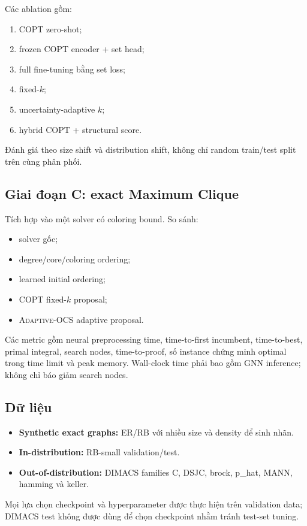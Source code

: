 \documentclass[11pt,a4paper]{article}
\newcommand{\method}{\textsc{Adaptive-OCS}}
\begin{document}
Các ablation gồm:
\begin{enumerate}[nosep]
    \item COPT zero-shot;
    \item frozen COPT encoder + set head;
    \item full fine-tuning bằng set loss;
    \item fixed-$k$;
    \item uncertainty-adaptive $k$;
    \item hybrid COPT + structural score.
\end{enumerate}
Đánh giá theo size shift và distribution shift, không chỉ random train/test split trên cùng phân phối.

\subsection{Giai đoạn C: exact Maximum Clique}

Tích hợp vào một solver có coloring bound. So sánh:
\begin{itemize}[nosep]
    \item solver gốc;
    \item degree/core/coloring ordering;
    \item learned initial ordering;
    \item COPT fixed-$k$ proposal;
    \item \method{} adaptive proposal.
\end{itemize}

Các metric gồm neural preprocessing time, time-to-first incumbent, time-to-best, primal integral, search nodes, time-to-proof, số instance chứng minh optimal trong time limit và peak memory. Wall-clock time phải bao gồm GNN inference; không chỉ báo giảm search nodes.

\subsection{Dữ liệu}

\begin{itemize}[nosep]
    \item \textbf{Synthetic exact graphs:} ER/RB với nhiều size và density để sinh nhãn.
    \item \textbf{In-distribution:} RB-small validation/test.
    \item \textbf{Out-of-distribution:} DIMACS families C, DSJC, brock, p\_hat, MANN, hamming và keller.
\end{itemize}
Mọi lựa chọn checkpoint và hyperparameter được thực hiện trên validation data; DIMACS test không được dùng để chọn checkpoint nhằm tránh test-set tuning.
\end{document}
